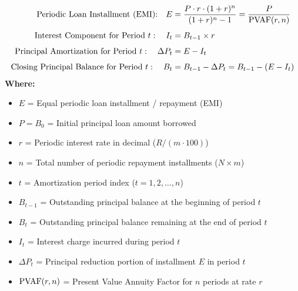 \newpage
\begin{formulabox}
\begin{align*}
    \text{Periodic Loan Installment (EMI):} \quad E &= \frac{P \cdot r \cdot (1 + r)^n}{(1 + r)^n - 1} = \frac{P}{\operatorname{PVAF}(r, n)} \\[4pt]
    \text{Interest Component for Period } t: \quad I_t &= B_{t-1} \times r \\[4pt]
    \text{Principal Amortization for Period } t: \quad \Delta P_t &= E - I_t \\[4pt]
    \text{Closing Principal Balance for Period } t: \quad B_t &= B_{t-1} - \Delta P_t = B_{t-1} - (E - I_t)
\end{align*}
\textbf{Where:}
\begin{itemize}[noitemsep, topsep=2pt]
    \item $E$ = Equal periodic loan installment / repayment (EMI)
    \item $P = B_0$ = Initial principal loan amount borrowed
    \item $r$ = Periodic interest rate in decimal ($R / (m \cdot 100)$)
    \item $n$ = Total number of periodic repayment installments ($N \times m$)
    \item $t$ = Amortization period index ($t = 1, 2, \dots, n$)
    \item $B_{t-1}$ = Outstanding principal balance at the beginning of period $t$
    \item $B_t$ = Outstanding principal balance remaining at the end of period $t$
    \item $I_t$ = Interest charge incurred during period $t$
    \item $\Delta P_t$ = Principal reduction portion of installment $E$ in period $t$
    \item $\operatorname{PVAF}(r, n)$ = Present Value Annuity Factor for $n$ periods at rate $r$
\end{itemize}
\end{formulabox}

